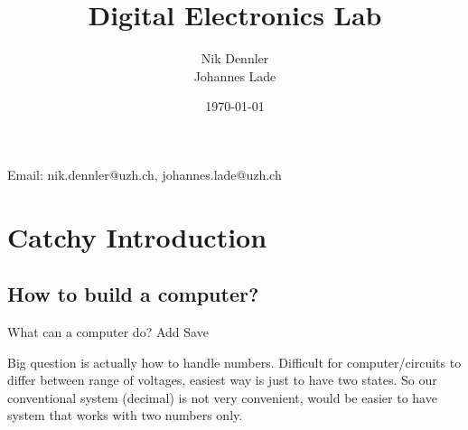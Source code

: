 \documentclass[10pt,a4paper]{article}
\author{Nik Dennler \\ Johannes Lade}
\title{Digital Electronics Lab}
\date{\today{}}
\begin{document}
	
\begin{titlepage}
	\maketitle
		\begin{center}
			Email: nik.dennler@uzh.ch, johannes.lade@uzh.ch
		\end{center}
	\thispagestyle{empty}
\end{titlepage}




\tableofcontents
\newpage

\section{Catchy Introduction}
\subsection{How to build a computer?}
What can a computer do?
Add
Save

Big question is actually how to handle numbers. Difficult for computer/circuits to differ between range of voltages, easiest way is just to have two states. So our conventional system (decimal) is not very convenient, would be easier to have system that works with two numbers only. 






\end{document}
